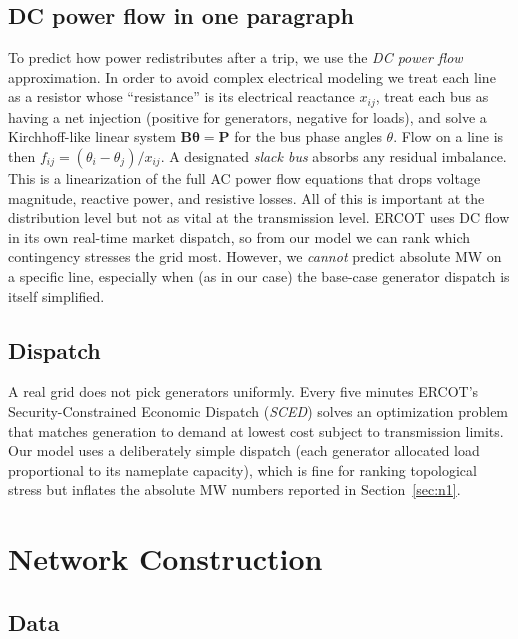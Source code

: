 \documentclass[12pt,letterpaper]{article}
\begin{document}
\subsection{DC power flow in one paragraph}

To predict how power redistributes after a trip, we use the \emph{DC power flow} approximation. In order to avoid complex electrical modeling we treat each line as a resistor whose ``resistance'' is its electrical reactance $x_{ij}$, treat each bus as having a net injection (positive for generators, negative for loads), and solve a Kirchhoff-like linear system $\mathbf{B}\boldsymbol{\theta} = \mathbf{P}$ for the bus phase angles $\theta$. Flow on a line is then $f_{ij} = (\theta_i - \theta_j)/x_{ij}$. A designated \emph{slack bus} absorbs any residual imbalance. This is a linearization of the full AC power flow equations that drops voltage magnitude, reactive power, and resistive losses. All of this is important at the distribution level but not as vital at the transmission level. ERCOT uses DC flow in its own real-time market dispatch, so from our model we can rank which contingency stresses the grid most. However, we \emph{cannot} predict absolute MW on a specific line, especially when (as in our case) the base-case generator dispatch is itself simplified.

\subsection{Dispatch}

A real grid does not pick generators uniformly. Every five minutes ERCOT's Security-Constrained Economic Dispatch (\emph{SCED}) solves an optimization problem that matches generation to demand at lowest cost subject to transmission limits. Our model uses a deliberately simple dispatch (each generator allocated load proportional to its nameplate capacity), which is fine for ranking topological stress but inflates the absolute MW numbers reported in Section~\ref{sec:n1}.

\section{Network Construction}
\label{sec:network}

\subsection{Data}
\end{document}
